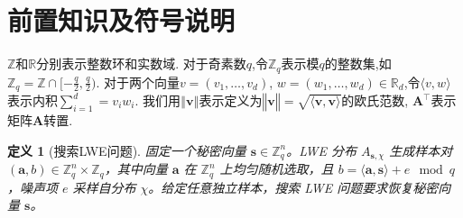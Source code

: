 \documentclass[12pt,a4paper]{article}
\newtheorem{definition}{定义} %
\numberwithin{equation}{section}
\begin{document}



\section{前置知识及符号说明}
$\mathbb{Z}$和$\mathbb{R}$分别表示整数环和实数域.
对于奇素数$q$,令$\mathbb{Z}_q$表示模$q$的整数集,如$\mathbb{Z}_q = \mathbb{Z}\cap[-\frac{q}{2},\frac{q}{2})$.
对于两个向量$v =(v_1 , \ldots , v_d)$, $w = ( w_1 , \ldots , w_d) \in \mathbb{R}_d$,令$\langle v,w\rangle$表示内积$ \sum_{i=1}^{d}= v_iw_i$.
我们用$‖\mathbf{v}‖$表示定义为$‖\mathbf{v}‖=\sqrt{\langle\mathbf{v},\mathbf{v}\rangle}$的欧氏范数, $\mathbf{A}^\top$表示矩阵$\mathbf{A}$转置.





\begin{definition}[搜索LWE问题]
固定一个秘密向量 \(\mathbf{s} \in \mathbb{Z}_q^n\)。LWE 分布 \(A_{\mathbf{s},\chi}\) 生成样本对 \((\mathbf{a}, b) \in \mathbb{Z}_q^n \times \mathbb{Z}_q\)，其中向量 \(\mathbf{a}\) 在 \(\mathbb{Z}_q^n\) 上均匀随机选取，且 \(b = \langle \mathbf{a}, \mathbf{s} \rangle + e \mod q\)，噪声项 \(e\) 采样自分布 \(\chi\)。给定任意独立样本，搜索 LWE 问题要求恢复秘密向量 \(\mathbf{s}\)。
\end{definition}
\end{document}
